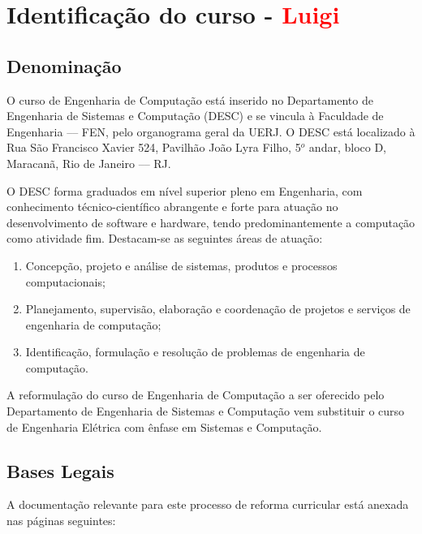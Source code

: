 \chapter{Identificação do curso - \textcolor{red}{Luigi}}

\section{Denominação}

O curso de Engenharia de Computação está inserido no Departamento de Engenharia de Sistemas e Computação (DESC) e se vincula à Faculdade de Engenharia –-- FEN, pelo organograma geral da UERJ. O DESC está localizado à Rua São Francisco Xavier 524, Pavilhão João Lyra Filho, 5$^{o}$ andar, bloco D, Maracanã, Rio de Janeiro –-- RJ.

O DESC forma graduados em nível superior pleno em Engenharia, com conhecimento técnico-científico abrangente e forte para atuação no desenvolvimento de software e hardware, tendo predominantemente a computação como atividade fim. Destacam-se as seguintes áreas de atuação:

\begin{enumerate}
    \item Concepção, projeto e análise de sistemas, produtos e processos computacionais;
    \item Planejamento, supervisão, elaboração e coordenação de projetos e serviços de engenharia de computação;
    \item Identificação, formulação e resolução de problemas de engenharia de computação.
\end{enumerate}

A reformulação do curso de Engenharia de Computação a ser oferecido pelo Departamento de Engenharia de Sistemas e Computação vem substituir o curso de Engenharia Elétrica com ênfase em Sistemas e Computação.

\section{Bases Legais}

A documentação relevante para este processo de reforma curricular está anexada nas páginas seguintes:

